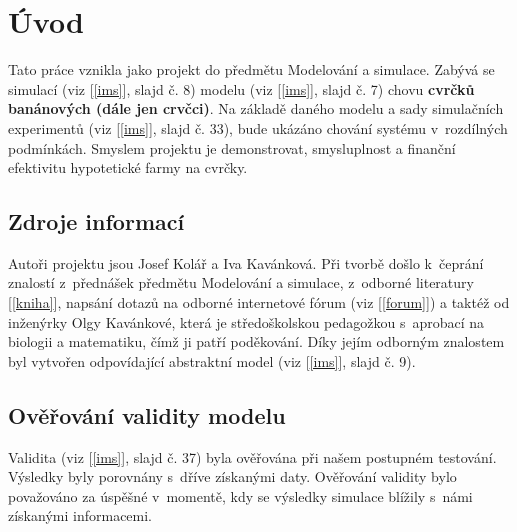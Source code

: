 \documentclass[11pt, a4paper, titlepage]{article}
\begin{document}
    
    \pagestyle{fancy}
    \tableofcontents
    \pagebreak

    \section{Úvod}
    Tato práce vznikla jako projekt do předmětu Modelování a simulace. Zabývá se simulací (viz [\ref{ims}], slajd č. 8)
    modelu (viz [\ref{ims}], slajd č. 7) chovu \textbf{cvrčků banánových (dále jen crvčci)}. Na základě daného modelu a sady
    simulačních experimentů (viz [\ref{ims}], slajd č. 33), bude ukázáno chování systému v~rozdílných podmínkách.
    Smyslem projektu je demonstrovat, smysluplnost a finanční efektivitu hypotetické farmy na cvrčky.

    \subsection{Zdroje informací}
    Autoři projektu jsou Josef Kolář a Iva Kavánková. Při tvorbě došlo k~čeprání znalostí z~přednášek předmětu Modelování a simulace, z~odborné literatury
    [\ref{kniha}], napsání dotazů na odborné internetové fórum (viz [\ref{forum}]) a taktéž od inženýrky Olgy Kavánkové,
    která je středoškolskou pedagožkou s~aprobací na biologii a matematiku, čímž ji patří poděkování.
    Díky jejím odborným znalostem byl vytvořen odpovídající abstraktní model (viz [\ref{ims}], slajd č. 9).

    \subsection{Ověřování validity modelu}
    Validita (viz [\ref{ims}], slajd č. 37) byla ověřována při našem postupném testování. Výsledky byly porovnány s~dříve získanými daty.
    Ověřování validity bylo považováno za úspěšné v~momentě, kdy se výsledky simulace blížily s~námi získanými informacemi.
\end{document}
